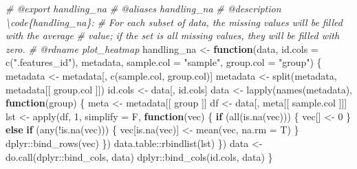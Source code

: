 \documentclass[
]{article}
\newenvironment{Shaded}{\begin{snugshade}}{\end{snugshade}}
\newcommand{\AttributeTok}[1]{\textcolor[rgb]{0.77,0.63,0.00}{#1}}
\newcommand{\CommentTok}[1]{\textcolor[rgb]{0.56,0.35,0.01}{\textit{#1}}}
\newcommand{\ControlFlowTok}[1]{\textcolor[rgb]{0.13,0.29,0.53}{\textbf{#1}}}
\newcommand{\DecValTok}[1]{\textcolor[rgb]{0.00,0.00,0.81}{#1}}
\newcommand{\FunctionTok}[1]{\textcolor[rgb]{0.00,0.00,0.00}{#1}}
\newcommand{\NormalTok}[1]{#1}
\newcommand{\OtherTok}[1]{\textcolor[rgb]{0.56,0.35,0.01}{#1}}
\newcommand{\SpecialCharTok}[1]{\textcolor[rgb]{0.00,0.00,0.00}{#1}}
\newcommand{\StringTok}[1]{\textcolor[rgb]{0.31,0.60,0.02}{#1}}
\begin{document}
\begin{Shaded}
\begin{Highlighting}[]
\CommentTok{\#\textquotesingle{} @export handling\_na}
\CommentTok{\#\textquotesingle{} @aliases handling\_na}
\CommentTok{\#\textquotesingle{} @description \textbackslash{}code\{handling\_na\}:}
\CommentTok{\#\textquotesingle{} For each subset of data, the missing values will be filled with the average}
\CommentTok{\#\textquotesingle{} value; if the set is all missing values, they will be filled with zero.}
\CommentTok{\#\textquotesingle{} @rdname plot\_heatmap}
\NormalTok{handling\_na }\OtherTok{\textless{}{-}} \ControlFlowTok{function}\NormalTok{(data, }\AttributeTok{id.cols =} \FunctionTok{c}\NormalTok{(}\StringTok{".features\_id"}\NormalTok{),}
\NormalTok{  metadata, }\AttributeTok{sample.col =} \StringTok{"sample"}\NormalTok{, }\AttributeTok{group.col =} \StringTok{"group"}\NormalTok{)}
\NormalTok{\{}
\NormalTok{  metadata }\OtherTok{\textless{}{-}}\NormalTok{ metadata[, }\FunctionTok{c}\NormalTok{(sample.col, group.col)]}
\NormalTok{  metadata }\OtherTok{\textless{}{-}} \FunctionTok{split}\NormalTok{(metadata, metadata[[ group.col ]])}
\NormalTok{  id.cols }\OtherTok{\textless{}{-}}\NormalTok{ data[, id.cols]}
\NormalTok{  data }\OtherTok{\textless{}{-}} \FunctionTok{lapply}\NormalTok{(}\FunctionTok{names}\NormalTok{(metadata),}
    \ControlFlowTok{function}\NormalTok{(group) \{}
\NormalTok{      meta }\OtherTok{\textless{}{-}}\NormalTok{ metadata[[ group ]]}
\NormalTok{      df }\OtherTok{\textless{}{-}}\NormalTok{ data[, meta[[ sample.col ]]]}
\NormalTok{      lst }\OtherTok{\textless{}{-}} \FunctionTok{apply}\NormalTok{(df, }\DecValTok{1}\NormalTok{, }\AttributeTok{simplify =}\NormalTok{ F,}
        \ControlFlowTok{function}\NormalTok{(vec) \{}
          \ControlFlowTok{if}\NormalTok{ (}\FunctionTok{all}\NormalTok{(}\FunctionTok{is.na}\NormalTok{(vec))) \{}
\NormalTok{            vec[] }\OtherTok{\textless{}{-}} \DecValTok{0}
\NormalTok{          \} }\ControlFlowTok{else} \ControlFlowTok{if}\NormalTok{ (}\FunctionTok{any}\NormalTok{(}\SpecialCharTok{!}\FunctionTok{is.na}\NormalTok{(vec))) \{}
\NormalTok{            vec[}\FunctionTok{is.na}\NormalTok{(vec)] }\OtherTok{\textless{}{-}} \FunctionTok{mean}\NormalTok{(vec, }\AttributeTok{na.rm =}\NormalTok{ T)}
\NormalTok{          \}}
\NormalTok{          dplyr}\SpecialCharTok{::}\FunctionTok{bind\_rows}\NormalTok{(vec)}
\NormalTok{        \})}
\NormalTok{      data.table}\SpecialCharTok{::}\FunctionTok{rbindlist}\NormalTok{(lst)}
\NormalTok{    \})}
\NormalTok{  data }\OtherTok{\textless{}{-}} \FunctionTok{do.call}\NormalTok{(dplyr}\SpecialCharTok{::}\NormalTok{bind\_cols, data)}
\NormalTok{  dplyr}\SpecialCharTok{::}\FunctionTok{bind\_cols}\NormalTok{(id.cols, data)}
\NormalTok{\}}


\end{Highlighting}
\end{Shaded}
\end{document}
